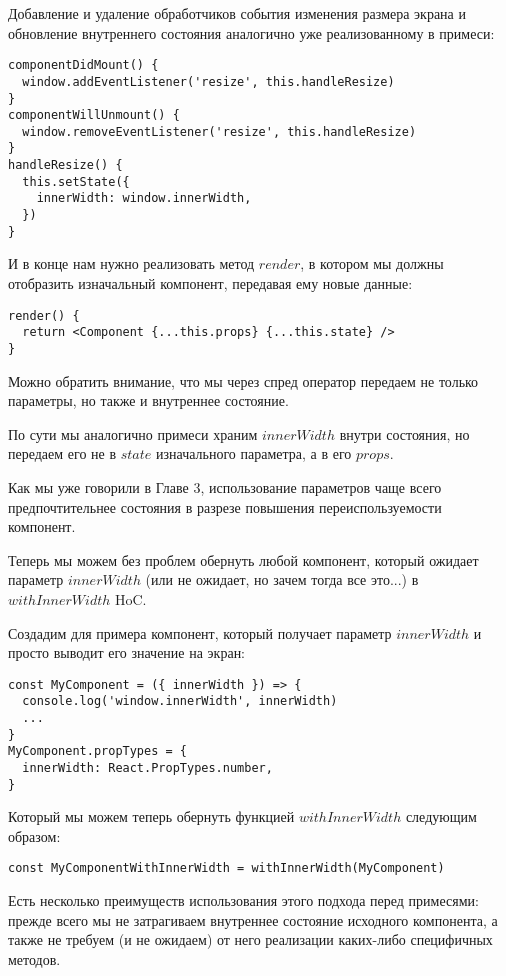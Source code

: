 Добавление и удаление обработчиков события изменения размера экрана и обновление внутреннего состояния аналогично уже реализованному в примеси:

\begin{lstlisting}
componentDidMount() {
  window.addEventListener('resize', this.handleResize)
}
componentWillUnmount() {
  window.removeEventListener('resize', this.handleResize)
}
handleResize() {
  this.setState({
    innerWidth: window.innerWidth,
  })
}
\end{lstlisting}

И в конце нам нужно реализовать метод $render$, в котором мы должны отобразить изначальный компонент, передавая ему новые данные:

\begin{lstlisting}
render() {
  return <Component {...this.props} {...this.state} />
}
\end{lstlisting}

Можно обратить внимание, что мы через спред оператор передаем не только параметры, но также и внутреннее состояние.

По сути мы аналогично примеси храним $innerWidth$ внутри состояния, но передаем его не в $state$ изначального параметра, а в его $props$.

Как мы уже говорили в Главе 3, использование параметров чаще всего предпочтительнее состояния в разрезе повышения переиспользуемости компонент.

Теперь мы можем без проблем обернуть любой компонент, который ожидает параметр $innerWidth$ (или не ожидает, но зачем тогда все это...) в $withInnerWidth$ HoC.

Создадим для примера компонент, который получает параметр $innerWidth$ и просто выводит его значение на экран:

\begin{lstlisting}
const MyComponent = ({ innerWidth }) => {
  console.log('window.innerWidth', innerWidth)
  ...
}
MyComponent.propTypes = {
  innerWidth: React.PropTypes.number,
}
\end{lstlisting}

Который мы можем теперь обернуть функцией $withInnerWidth$ следующим образом:

\begin{lstlisting}
const MyComponentWithInnerWidth = withInnerWidth(MyComponent)
\end{lstlisting}

Есть несколько преимуществ использования этого подхода перед примесями: прежде всего мы не затрагиваем внутреннее состояние исходного компонента, а также не требуем (и не ожидаем) от него реализации каких-либо специфичных методов.

